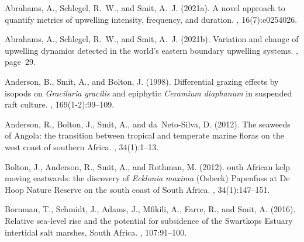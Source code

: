 


\nocite{*}


\begin{thebibliography}{}

  Abrahams, A., Schlegel, R.~W., and Smit, A.~J. (2021a).
  \newblock A novel approach to quantify metrics of upwelling intensity,
    frequency, and duration.
  , 16(7):e0254026.
  
  Abrahams, A., Schlegel, R.~W., and Smit, A.~J. (2021b).
  \newblock Variation and change of upwelling dynamics detected in the world’s
    eastern boundary upwelling systems.
  , page~29.
  
  Anderson, B., Smit, A., and Bolton, J. (1998).
  \newblock Differential grazing effects by isopods on \emph{Gracilaria gracilis}
    and epiphytic \emph{Ceramium diaphanum} in suspended raft culture.
  , 169(1-2):99--109.
  
  Anderson, R., Bolton, J., Smit, A., and da~Neto-Silva, D. (2012).
  \newblock The seaweeds of {A}ngola: the transition between tropical and
    temperate marine floras on the west coast of southern {A}frica.
  , 34(1):1--13.
  
  Bolton, J., Anderson, R., Smit, A., and Rothman, M. (2012).
  outh {A}frican kelp moving eastwards: the discovery of
    \emph{Ecklonia maxima} ({O}sbeck) {P}apenfuss at {D}e {H}oop {N}ature
    {R}eserve on the south coast of {S}outh {A}frica.
  , 34(1):147--151.
  
  Bornman, T., Schmidt, J., Adams, J., Mfikili, A., Farre, R., and Smit, A.
    (2016).
  \newblock Relative sea-level rise and the potential for subsidence of the
    {S}wartkops {E}stuary intertidal salt marshes, {S}outh {A}frica.
  , 107:91--100.
  

\end{thebibliography}
